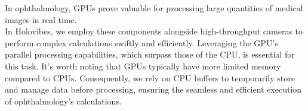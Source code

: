 In ophthalmology, GPUs prove valuable for processing large quantities of medical images in real time.\\

In Holovibes, we employ these components alongside high-throughput cameras to perform complex calculations swiftly and efficiently. Leveraging the GPU's parallel processing capabilities, which surpass those of the CPU, is essential for this task. It's worth noting that GPUs typically have more limited memory compared to CPUs. Consequently, we rely on CPU buffers to temporarily store and manage data before processing, ensuring the seamless and efficient execution of ophthalmology's calculations.